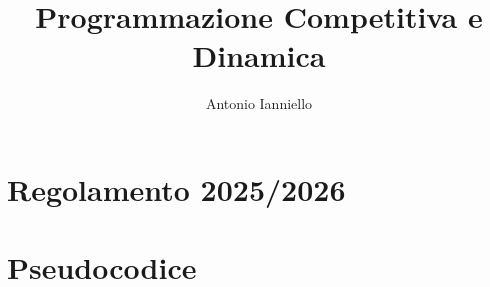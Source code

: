 \documentclass[a4paper,12pt]{report}
\title{Programmazione Competitiva e Dinamica}
\author{Antonio Ianniello}
\date{}
\begin{document}
	
	\maketitle
	\newpage
	\tableofcontents
	
	\newpage
	
	
	
	
	
	
	



	
	\appendix
	
		\chapter{Regolamento 2025/2026}
			\label{appendice:Regolamento2025}
			
			
		\chapter{Pseudocodice}
			\label{appendice:pseudocodice}
			
			
			
	
\end{document}
